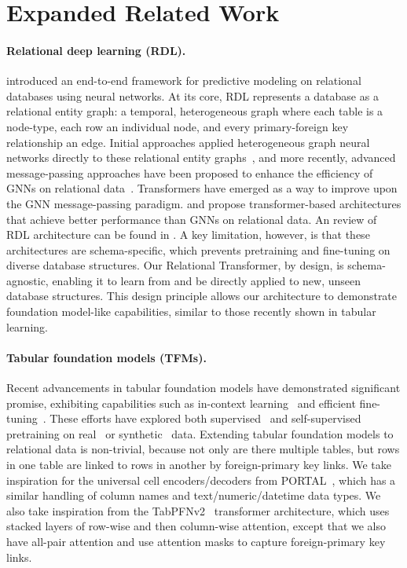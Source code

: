 \section{Expanded Related Work}
\label{appsec:related_work}

\paragraph{Relational deep learning (RDL).} \citet{rdl} introduced an end-to-end framework for predictive modeling on relational databases using neural networks. At its core, RDL represents a database as a relational entity graph: a temporal, heterogeneous graph where each table is a node-type, each row an individual node, and every primary-foreign key relationship an edge. Initial approaches applied heterogeneous graph neural networks directly to these relational entity graphs~\citep{relbench}, and more recently, advanced message-passing approaches have been proposed to enhance the efficiency of GNNs on relational data~\citep{relgnn}. Transformers have emerged as a way to improve upon the GNN message-passing paradigm. \citet{dbformer} and \citet{relgt} propose transformer-based architectures that achieve better performance than GNNs on relational data. An review of RDL architecture can be found in \cite{dwivedi2025relational}. A key limitation, however, is that these architectures are schema-specific, which prevents pretraining and fine-tuning on diverse database structures. Our Relational Transformer, by design, is schema-agnostic, enabling it to learn from and be directly applied to new, unseen database structures. This design principle allows our architecture to demonstrate foundation model-like capabilities, similar to those recently shown in tabular learning.

\paragraph{Tabular foundation models (TFMs).}
Recent advancements in tabular foundation models have demonstrated significant promise, exhibiting capabilities such as in-context learning~\citep{tabpfn, tabicl} and efficient fine-tuning~\citep{carte}. 
These efforts have explored both supervised~\citep{tabpfn} and self-supervised~\citep{portal, carte}  pretraining on real~\citep{carte} or synthetic~\citep{tabpfn, tabicl} data.
Extending tabular foundation models to relational data is non-trivial, because not only are there multiple tables, but rows in one table are linked to rows in another by foreign-primary key links.
We take inspiration for the universal cell encoders/decoders from PORTAL~\citep{portal}, which has a similar handling of column names and text/numeric/datetime data types.
We also take inspiration from the TabPFNv2~\citep{tabpfnv2} transformer architecture, which uses stacked layers of row-wise and then column-wise attention, except that we also have all-pair attention and use attention masks to capture
foreign-primary key links.


